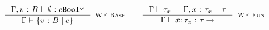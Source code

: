 \hfill{\fbox{\iswellformed{\env}{\typ}}}\\

$$
\inference{
  \hastype{\env,\tbind{v}{\btyp}}{\emptyset}{\refa}{\tbool^{\tlabel}}
}{
	\iswellformed{\env}{\tref{v}{\btyp}{\refa}}
}[\rwbase]
\qquad
\inference{
	\iswellformed{\env}{\typ_x} &
	\iswellformed{\env,\tbind{x}{\typ_x}}{\typ}
}{
	\iswellformed{\env}{\trfun{x}{\typ_x}{\typ}}
}[\rwfun]
$$
